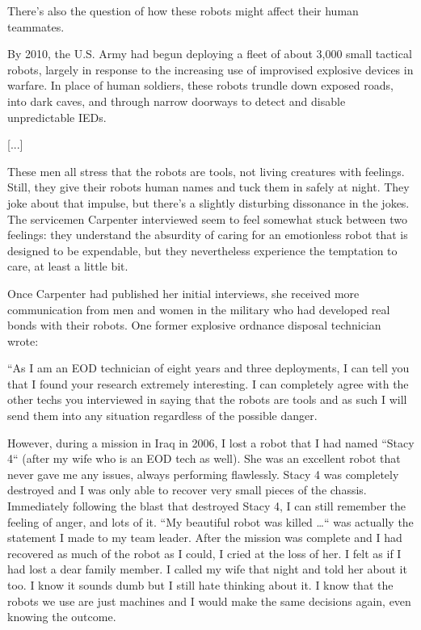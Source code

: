 \documentclass[9pt,a4paper]{extarticle}
\begin{document}
There’s also the question of how these robots might affect their human teammates.

By 2010, the U.S. Army had begun deploying a fleet of about 3,000 small tactical robots, largely in response to the increasing use of improvised explosive devices in warfare. In place of human soldiers, these robots trundle down exposed roads, into dark caves, and through narrow doorways to detect and disable unpredictable IEDs.

[...]

These men all stress that the robots are tools, not living creatures with feelings. Still, they give their robots human names and tuck them in safely at night. They joke about that impulse, but there’s a slightly disturbing dissonance in the jokes. The servicemen Carpenter interviewed seem to feel somewhat stuck between two feelings: they understand the absurdity of caring for an emotionless robot that is designed to be expendable, but they nevertheless experience the temptation to care, at least a little bit.

Once Carpenter had published her initial interviews, she received more communication from men and women in the military who had developed real bonds with their robots. One former explosive ordnance disposal technician wrote:

“As I am an EOD technician of eight years and three deployments, I can tell you that I found your research extremely interesting. I can completely agree with the other techs you interviewed in saying that the robots are tools and as such I will send them into any situation regardless of the possible danger.

However, during a mission in Iraq in 2006, I lost a robot that I had named “Stacy 4“ (after my wife who is an EOD tech as well). She was an excellent robot that never gave me any issues, always performing flawlessly. ­Stacy 4 was completely destroyed and I was only able to recover very small pieces of the chassis. Immediately following the blast that destroyed ­Stacy 4, I can still remember the feeling of anger, and lots of it. “My beautiful robot was killed …“ was actually the statement I made to my team leader. After the mission was complete and I had recovered as much of the robot as I could, I cried at the loss of her. I felt as if I had lost a dear family member. I called my wife that night and told her about it too. I know it sounds dumb but I still hate thinking about it. I know that the robots we use are just machines and I would make the same decisions again, even knowing the outcome.
\end{document}
